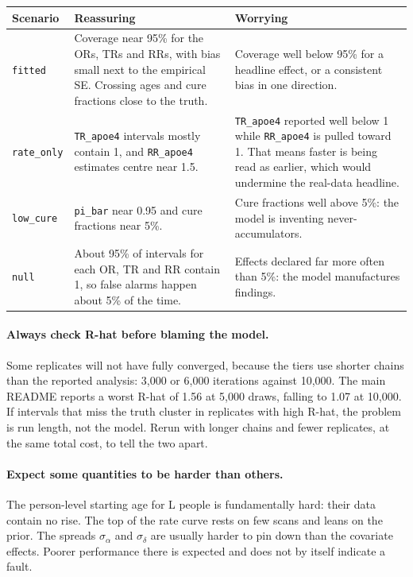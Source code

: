 \documentclass[11pt]{article}
\newcommand{\code}[1]{\texttt{\small #1}}
\begin{document}
\begin{center}
\small
\begin{tabularx}{\textwidth}{@{}l X X@{}}
\toprule
Scenario & Reassuring & Worrying \\
\midrule
\code{fitted} & Coverage near 95\% for the ORs, TRs and RRs, with bias small next to the empirical SE. Crossing ages and cure fractions close to the truth. & Coverage well below 95\% for a headline effect, or a consistent bias in one direction. \\
\code{rate\_only} & \code{TR\_apoe4} intervals mostly contain 1, and \code{RR\_apoe4} estimates centre near 1.5. & \code{TR\_apoe4} reported well below 1 while \code{RR\_apoe4} is pulled toward 1. That means faster is being read as earlier, which would undermine the real-data headline. \\
\code{low\_cure} & \code{pi\_bar} near 0.95 and cure fractions near 5\%. & Cure fractions well above 5\%: the model is inventing never-accumulators. \\
\code{null} & About 95\% of intervals for each OR, TR and RR contain 1, so false alarms happen about 5\% of the time. & Effects declared far more often than 5\%: the model manufactures findings. \\
\bottomrule
\end{tabularx}
\end{center}

\paragraph{Always check R-hat before blaming the model.} Some replicates will not have fully converged, because the tiers use shorter chains than the reported analysis: 3,000 or 6,000 iterations against 10,000. The main README reports a worst R-hat of 1.56 at 5,000 draws, falling to 1.07 at 10,000. If intervals that miss the truth cluster in replicates with high R-hat, the problem is run length, not the model. Rerun with longer chains and fewer replicates, at the same total cost, to tell the two apart.

\paragraph{Expect some quantities to be harder than others.} The person-level starting age for L people is fundamentally hard: their data contain no rise. The top of the rate curve rests on few scans and leans on the prior. The spreads $\sigma_\alpha$ and $\sigma_\delta$ are usually harder to pin down than the covariate effects. Poorer performance there is expected and does not by itself indicate a fault.
\end{document}
